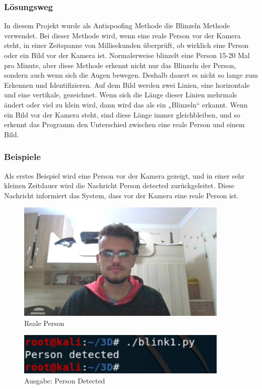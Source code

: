 \subsubsection{Lösungsweg}
In diesem Projekt wurde als Antispoofing Methode die Blinzeln Methode verwendet. Bei dieser Methode wird, wenn eine reale Person vor der Kamera steht, in einer Zeitspanne von Millisekunden überprüft, ob wirklich eine Person oder ein Bild vor der Kamera ist. Normalerweise blinzelt eine Person 15-20 Mal pro Minute, aber diese Methode erkennt nicht nur das Blinzeln der Person, sondern auch wenn sich die Augen bewegen. Deshalb dauert es nicht so lange zum Erkennen und Identifizieren.
Auf dem Bild werden zwei Linien, eine horizontale und eine vertikale, gezeichnet. Wenn sich die Länge dieser Linien mehrmals ändert oder viel zu klein wird, dann wird das als ein „Blinzeln“ erkannt. Wenn ein Bild vor der Kamera steht, sind diese Länge immer gleichbleiben, und so erkennt das Programm den Unterschied zwischen eine reale Person und einem Bild.
\newpage
\subsubsection{Beispiele}
Als erstes Beispiel wird eine Person vor der Kamera gezeigt, und in einer sehr kleinen Zeitdauer wird die Nachricht Person detected zurückgeleitet. Diese Nachricht informiert das System, dass vor der Kamera eine reale Person ist.\\
\begin{figure}[ht]
  \centering
    \includegraphics[width=0.9\textwidth]{./figures/jordiR.jpg}
      \caption{Reale Person}
\end{figure}
\begin{figure}[ht]
  \centering
    \includegraphics[width=0.9\textwidth]{./figures/detected.png}
      \caption{Ausgabe: Person Detected}
\end{figure}

